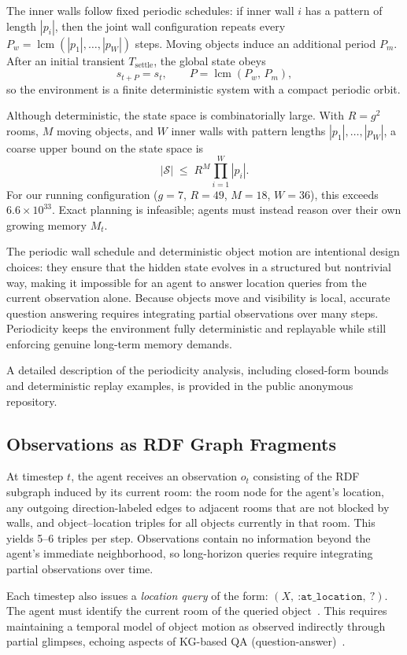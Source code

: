 \documentclass[11pt]{article}
\begin{document}
The inner walls follow fixed periodic schedules: if inner wall $i$ has a
pattern of length $|p_i|$, then the joint wall configuration repeats every
$P_w = \operatorname{lcm}(|p_1|,\dots,|p_W|)$ steps. Moving objects induce an
additional period $P_m$. After an initial transient $T_{\text{settle}}$, the
global state obeys
\[
  s_{t+P} = s_t, \qquad P = \operatorname{lcm}(P_w,\, P_m),
\]
so the environment is a finite deterministic system with a compact periodic
orbit.

Although deterministic, the state space is combinatorially large. With
$R = g^2$ rooms, $M$ moving objects, and $W$ inner walls with pattern lengths
$|p_1|,\dots,|p_W|$, a coarse upper bound on the state space is
\[
  |\mathcal{S}| \;\le\; R^M \prod_{i=1}^{W} |p_i|.
\]
For our running configuration ($g{=}7$,
$R{=}49$, $M{=}18$, $W{=}36$), this exceeds $6.6\times 10^{33}$.
Exact planning is infeasible; agents must instead reason over their own growing memory $M_t$.

The periodic wall schedule and deterministic object motion are intentional
design choices: they ensure that the hidden state evolves in a structured but
nontrivial way, making it impossible for an agent to answer location queries
from the current observation alone. Because objects move and visibility is
local, accurate question answering requires integrating partial observations
over many steps. Periodicity keeps the environment fully deterministic and
replayable while still enforcing genuine long-term memory demands.

A detailed description of the periodicity analysis, including closed-form
bounds and deterministic replay examples, is provided in the public
anonymous repository.

\subsection{Observations as RDF Graph Fragments}

At timestep $t$, the agent receives an observation $o_t$ consisting of the RDF
subgraph induced by its current room: the room node for the agent’s location,
any outgoing direction-labeled edges to adjacent rooms that are not blocked by
walls, and object–location triples for all objects currently in that room. This
yields 5–6 triples per step. Observations contain no information
beyond the agent’s immediate neighborhood, so long-horizon queries require
integrating partial observations over time.


Each timestep also issues a \emph{location query} of the form: $(X,\ \texttt{:at\_location},\ ?)$.
The agent must identify the current room of the queried object~\cite{bordes2015largescalesimplequestionanswering}. This
requires maintaining a temporal model of object motion as observed
indirectly through partial glimpses, echoing aspects of KG-based QA (question-answer)~\cite{yih-etal-2015-semantic}.
\end{document}
